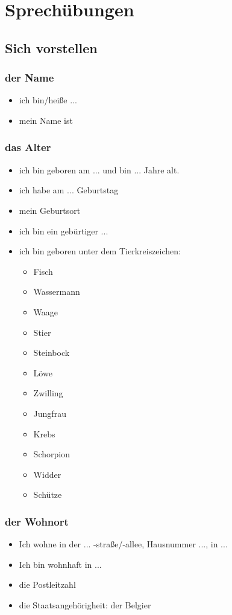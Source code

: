 \documentclass[main.tex]{subfiles}
\begin{document}
\chapter{Sprechübungen}
\section{Sich vorstellen}
\subsection{der Name}
\begin{itemize}
\item ich bin/heiße ...
\item mein Name ist
\end{itemize}

\subsection{das Alter}
\begin{itemize}
\item ich bin geboren am ... und bin ... Jahre alt.
\item ich habe am ... Geburtstag
\item mein Geburtsort
\item ich bin ein gebürtiger ...
\item ich bin geboren unter dem Tierkreiszeichen:
	\begin{itemize}
	\item Fisch
	\item Wassermann
	\item Waage
	\item Stier
	\item Steinbock
	\item Löwe
	\item Zwilling
	\item Jungfrau
	\item Krebs
	\item Schorpion
	\item Widder
	\item Schütze
	\end{itemize}
\end{itemize}
\pagebreak
\subsection{der Wohnort}
\begin{itemize}
\item Ich wohne in der ... -straße/-allee, Hausnummer ..., in ...
\item Ich bin wohnhaft in ...
\item die Postleitzahl
\item die Staatsangehörigheit: der Belgier
\end{itemize}
\end{document}
